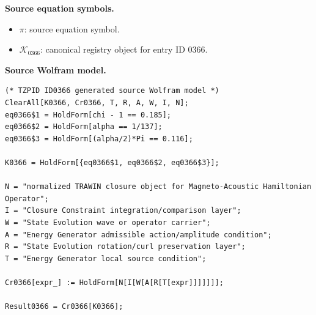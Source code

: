 \begin{minipage}[t]{0.49\linewidth}
\begingroup
\small
\raggedright
\textbf{Source equation symbols.}\par
\begin{itemize}[leftmargin=1.35em,itemsep=1pt,topsep=1pt,parsep=0pt]
    \item $\pi$: source equation symbol.
    \item $\mathcal{K}_{0366}$: canonical registry object for entry ID 0366.
\end{itemize}
\endgroup
\end{minipage}\hfill
\begin{minipage}[t]{0.47\linewidth}
\begingroup
\scriptsize
\raggedright
\textbf{Source Wolfram model.}\par
\begin{Verbatim}[fontsize=\tiny,breaklines=true,breakanywhere=true]
(* TZPID ID0366 generated source Wolfram model *)
ClearAll[K0366, Cr0366, T, R, A, W, I, N];
eq0366$1 = HoldForm[chi - 1 == 0.185];
eq0366$2 = HoldForm[alpha == 1/137];
eq0366$3 = HoldForm[(alpha/2)*Pi == 0.116];

K0366 = HoldForm[{eq0366$1, eq0366$2, eq0366$3}];

N = "normalized TRAWIN closure object for Magneto-Acoustic Hamiltonian Operator";
I = "Closure Constraint integration/comparison layer";
W = "State Evolution wave or operator carrier";
A = "Energy Generator admissible action/amplitude condition";
R = "State Evolution rotation/curl preservation layer";
T = "Energy Generator local source condition";

Cr0366[expr_] := HoldForm[N[I[W[A[R[T[expr]]]]]]];

Result0366 = Cr0366[K0366];
\end{Verbatim}
\endgroup
\end{minipage}

